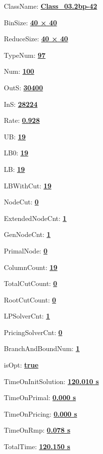 \documentclass[11pt]{article}
\begin{document}
\pagestyle{empty}


ClassName: \underline{\textbf{Class_03.2bp-42}}
\par
BinSize: \underline{\textbf{40 × 40}}
\par
ReduceSize: \underline{\textbf{40 × 40}}
\par
TypeNum: \underline{\textbf{97}}
\par
Num: \underline{\textbf{100}}
\par
OutS: \underline{\textbf{30400}}
\par
InS: \underline{\textbf{28224}}
\par
Rate: \underline{\textbf{0.928}}
\par
UB: \underline{\textbf{19}}
\par
LB0: \underline{\textbf{19}}
\par
LB: \underline{\textbf{19}}
\par
LBWithCut: \underline{\textbf{19}}
\par
NodeCut: \underline{\textbf{0}}
\par
ExtendedNodeCnt: \underline{\textbf{1}}
\par
GenNodeCnt: \underline{\textbf{1}}
\par
PrimalNode: \underline{\textbf{0}}
\par
ColumnCount: \underline{\textbf{19}}
\par
TotalCutCount: \underline{\textbf{0}}
\par
RootCutCount: \underline{\textbf{0}}
\par
LPSolverCnt: \underline{\textbf{1}}
\par
PricingSolverCnt: \underline{\textbf{0}}
\par
BranchAndBoundNum: \underline{\textbf{1}}
\par
isOpt: \underline{\textbf{true}}
\par
TimeOnInitSolution: \underline{\textbf{120.010 s}}
\par
TimeOnPrimal: \underline{\textbf{0.000 s}}
\par
TimeOnPricing: \underline{\textbf{0.000 s}}
\par
TimeOnRmp: \underline{\textbf{0.078 s}}
\par
TotalTime: \underline{\textbf{120.150 s}}
\par
\newpage


\end{document}

